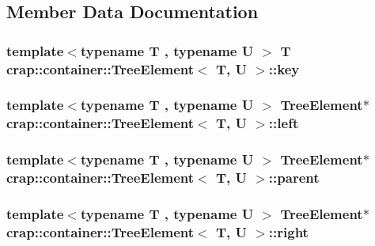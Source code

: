 \subsection{Member Data Documentation}
\hypertarget{structcrap_1_1container_1_1_tree_element_aa88bafeb32ce41efef4db753efa6a542}{
\subsubsection[{key}]{\setlength{\rightskip}{0pt plus 5cm}template$<$typename T , typename U $>$ T {\bf crap\-::container\-::\-Tree\-Element}$<$ T, U $>$\-::key}}\label{structcrap_1_1container_1_1_tree_element_aa88bafeb32ce41efef4db753efa6a542}
\hypertarget{structcrap_1_1container_1_1_tree_element_a2bfdfb584212fb946eeaeda183a55359}{
\subsubsection[{left}]{\setlength{\rightskip}{0pt plus 5cm}template$<$typename T , typename U $>$ {\bf Tree\-Element}$\ast$ {\bf crap\-::container\-::\-Tree\-Element}$<$ T, U $>$\-::left}}\label{structcrap_1_1container_1_1_tree_element_a2bfdfb584212fb946eeaeda183a55359}
\hypertarget{structcrap_1_1container_1_1_tree_element_a6b9d769dc6d4f4c38e05611e97903828}{
\subsubsection[{parent}]{\setlength{\rightskip}{0pt plus 5cm}template$<$typename T , typename U $>$ {\bf Tree\-Element}$\ast$ {\bf crap\-::container\-::\-Tree\-Element}$<$ T, U $>$\-::parent}}\label{structcrap_1_1container_1_1_tree_element_a6b9d769dc6d4f4c38e05611e97903828}
\hypertarget{structcrap_1_1container_1_1_tree_element_a324ebeea6528e5f4a687bcba5e5e60f8}{
\subsubsection[{right}]{\setlength{\rightskip}{0pt plus 5cm}template$<$typename T , typename U $>$ {\bf Tree\-Element}$\ast$ {\bf crap\-::container\-::\-Tree\-Element}$<$ T, U $>$\-::right}}\label{structcrap_1_1container_1_1_tree_element_a324ebeea6528e5f4a687bcba5e5e60f8}
